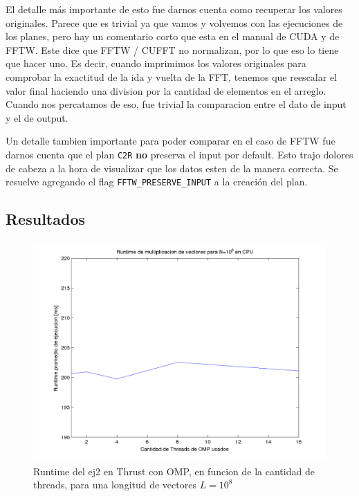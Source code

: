 El detalle m\'as importante de esto fue darnos cuenta como recuperar los valores originales. Parece que es trivial
ya que vamos y volvemos con las ejecuciones de los planes, pero hay un comentario corto que esta en el manual de CUDA y de 
FFTW. Este dice que FFTW / CUFFT no normalizan, por lo que eso lo tiene que hacer uno. Es decir, cuando imprimimos
los valores originales para comprobar la exactitud de la ida y vuelta de la FFT, tenemos que reescalar el valor
final haciendo una division por la cantidad de elementos en el arreglo. Cuando nos percatamos de eso, fue trivial
la comparacion entre el dato de input y el de output.

Un detalle tambien importante para poder comparar en el caso de FFTW fue darnos cuenta que el plan \texttt{C2R} 
\textbf{no} preserva el input por default. Esto trajo dolores de cabeza a la hora de visualizar que los 
datos esten de la manera correcta. Se resuelve agregando el flag \texttt{FFTW\_PRESERVE\_INPUT} a la creaci\'on
del plan.

\subsection{Resultados}

  \begin{figure}[H]
 \begin {center}
 \includegraphics[width=\hrwidth]{plots/ej1omp.png}
 \end {center}
 \caption{Runtime del ej2 en Thrust con OMP, en funcion de la cantidad de threads, para una longitud de vectores $L=10^8$}
 \label{fig:ej1OMP}
 \end{figure}

